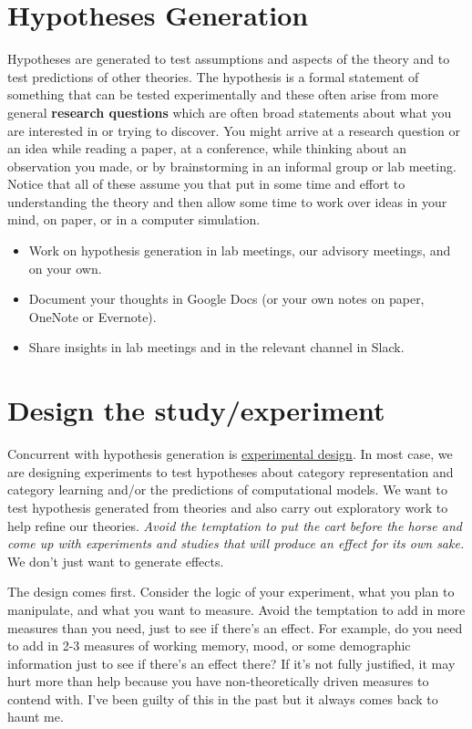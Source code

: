 \documentclass{article}
\begin{document}
\section{Hypotheses Generation}
Hypotheses are generated to test assumptions and aspects of the theory and to test predictions of other theories. The hypothesis is a formal statement of something that can be tested experimentally and these often arise from more general \textbf{research questions} which are often broad statements about what you are interested in or trying to discover. You might arrive at a research question or an idea while reading a paper, at a conference, while thinking about an observation you made, or by brainstorming in an informal group or lab meeting. Notice that all of these assume you that put in some time and effort to understanding the theory and then allow some time to work over ideas in your mind, on paper, or in a computer simulation.

\begin{itemize}
\item Work on hypothesis generation in lab meetings, our advisory meetings, and on your own.
\item Document your thoughts in Google Docs (or your own notes on paper, OneNote or Evernote).
\item Share insights in lab meetings and in the relevant channel in Slack.
\end{itemize}


\section{Design the study/experiment}
Concurrent with hypothesis generation is \href{https://opentextbc.ca/researchmethods/chapter/experimental-design/}{experimental design}. In most case, we are designing experiments to test hypotheses about category representation and category learning and/or the predictions of computational models. We want to test hypothesis generated from theories and also carry out exploratory work to help refine our theories. \textit{Avoid the temptation to put the cart before the horse and come up with experiments and studies that will produce an effect for its own sake.} We don't just want to generate effects. 

The design comes first. Consider the logic of your experiment, what you plan to manipulate, and what you want to measure. Avoid the temptation to add in more measures than you need, just to see if there's an effect. For example, do you need to add in 2-3 measures of working memory, mood, or some demographic information just to see if there's an effect there? If it's not fully justified, it may hurt more than help because you have non-theoretically driven measures to contend with. I've been guilty of this in the past but it always comes back to haunt me. 
\end{document}
